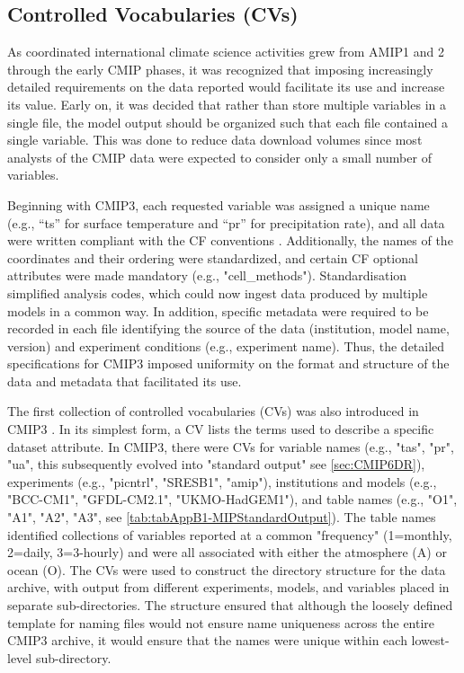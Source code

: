 \documentclass[gmd, preprint]{copernicus}
\newcommand{\mycomment}[1]{}
\begin{document}
\subsection{Controlled Vocabularies (CVs)}
\label{sec:CMIPCVs}
\mycomment{Attn: IPSL folks; MIP era realm evolution, dovetailing Variable request section}

As coordinated international climate science activities grew from AMIP1 and 2 through the early CMIP phases, it was recognized that imposing increasingly detailed requirements on the data reported would facilitate its use and increase its value. Early on, it was decided that rather than store multiple variables in a single file, the model output should be organized such that each file contained a single variable. This was done to reduce data download volumes since most analysts of the CMIP data were expected to consider only a small number of variables.

Beginning with CMIP3, each requested variable was assigned a unique name (e.g., “ts” for surface temperature and “pr” for precipitation rate), and all data were written compliant with the CF conventions \citep[e.g.,][]{taylor_pcmdi_2009}. Additionally, the names of the coordinates and their ordering were standardized, and certain CF optional attributes were made mandatory (e.g., "cell\_methods"). Standardisation simplified analysis codes, which could now ingest data produced by multiple models in a common way. In addition, specific metadata were required to be recorded in each file identifying the source of the data (institution, model name, version) and experiment conditions (e.g., experiment name). Thus, the detailed specifications for CMIP3 \citep[see][]{taylor_pcmdi_2005} imposed uniformity on the format and structure of the data and metadata that facilitated its use.

The first collection of controlled vocabularies (CVs) was also introduced in CMIP3 \citep[e.g.,][]{taylor_pcmdi_2005}. In its simplest form, a CV lists the terms used to describe a specific dataset attribute. In CMIP3, there were CVs for variable names (e.g., "tas", "pr", "ua", this subsequently evolved into "standard output" see \autoref{sec:CMIP6DR}), experiments (e.g., "picntrl", "SRESB1", "amip"), institutions and models (e.g., "BCC-CM1", "GFDL-CM2.1", "UKMO-HadGEM1"), and table names (e.g., "O1", "A1", "A2", "A3", see \autoref{tab:tabAppB1-MIPStandardOutput}). The table names identified collections of variables reported at a common "frequency" (1=monthly, 2=daily, 3=3-hourly) and were all associated with either the atmosphere (A) or ocean (O). The CVs were used to construct the directory structure for the data archive, with output from different experiments, models, and variables placed in separate sub-directories. The structure ensured that although the loosely defined template for naming files would not ensure name uniqueness across the entire CMIP3 archive, it would ensure that the names were unique within each lowest-level sub-directory.
\end{document}
